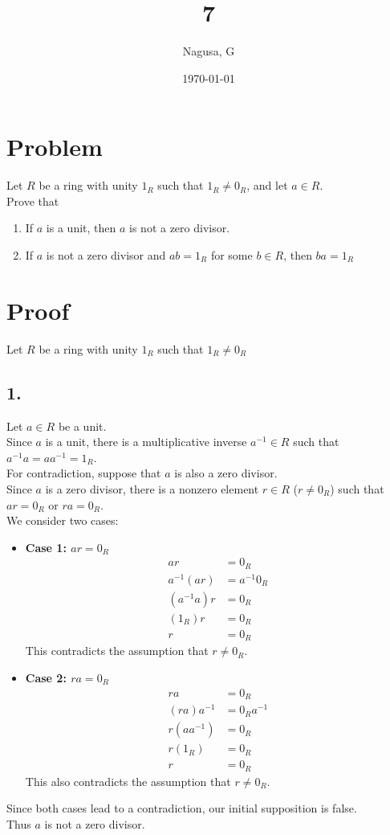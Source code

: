 \documentclass[11pt, a4paper]{article}
\title{7}
\author{Nagusa, G}
\date{\today}
\begin{document}
\maketitle

\section*{Problem}
Let $R$ be a ring with unity $1_R$ such that $1_R\neq 0_R$, and let $a \in R$.\\
Prove that
\begin{enumerate}
    \item If $a$ is a unit, then $a$ is not a zero divisor.
    \item If $a$ is not a zero divisor and $ab=1_R$ for some $b\in R$, then $ba=1_R$
\end{enumerate}

\section*{Proof}
Let $R$ be a ring with unity $1_R$ such that $1_R\neq 0_R$

\subsection*{1.}
Let $a \in R$ be a unit.\\
Since $a$ is a unit, there is a multiplicative inverse $a^{-1} \in R$ such that $a^{-1}a=aa^{-1}=1_R$.\\
For contradiction, suppose that $a$ is also a zero divisor.\\
Since $a$ is a zero divisor, there is a nonzero element $r \in R$ ($r \neq 0_R$) such that $ar = 0_R$ or $ra = 0_R$.\\
We consider two cases:
\begin{itemize}
    \item[--] \textbf{Case 1: $ar = 0_R$}\\
    \begin{align*}
        ar &= 0_R\\
        a^{-1}(ar) &= a^{-1}0_R\\
        (a^{-1}a)r &= 0_R\\
        (1_R)r &= 0_R\\
        r &= 0_R
    \end{align*}
    This contradicts the assumption that $r \neq 0_R$.
    
    \item[--] \textbf{Case 2: $ra = 0_R$}\\
    \begin{align*}
        ra &= 0_R\\
        (ra)a^{-1} &= 0_Ra^{-1}\\
        r(aa^{-1}) &= 0_R\\
        r(1_R) &= 0_R\\
        r &= 0_R
    \end{align*}
    This also contradicts the assumption that $r \neq 0_R$.
\end{itemize}
Since both cases lead to a contradiction, our initial supposition is false. \\
Thus $a$ is not a zero divisor.
\end{document}
